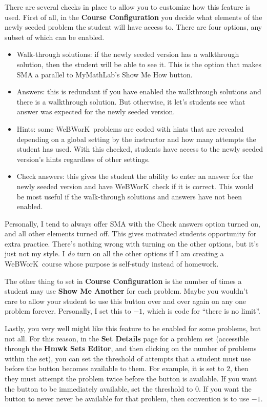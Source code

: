 \documentclass[12pt]{article}
\newcommand{\menu}[1]{\textbf{#1}}
\newcommand{\WW}{WeBWorK}
\newcommand{\HSE}{\menu{Hmwk Sets Editor}}
\begin{document}
There are several checks in place to allow you to customize how this feature is used. First of all, in the \menu{Course Configuration} you decide what elements of the newly seeded problem the student will have access to. There are four options, any subset of which can be enabled.
\begin{itemize}
\item Walk-through solutions: if the newly seeded version has a walkthrough solution, then the student will be able to see it. This is the option that makes SMA a parallel to MyMathLab's Show Me How button.
\item Answers: this is redundant if you have enabled the walkthrough solutions and there is a walkthrough solution. But otherwise, it let's students see what answer was expected for the newly seeded version.
\item Hints: some \WW\ problems are coded with hints that are revealed depending on a global setting by the instructor and how many attempts the student has used. With this checked, students have access to the newly seeded version's hints regardless of other settings.
\item Check answers: this gives the student the ability to enter an answer for the newly seeded version and have \WW\ check if it is correct. This would be most useful if the walk-through solutions and answers have not been enabled.
\end{itemize}

Personally, I tend to always offer SMA with the Check answers option turned on, and all other elements turned off. This gives motivated students opportunity for extra practice. There's nothing wrong with turning on the other options, but it's just not my style. I \emph{do} turn on all the other options if I am creating a \WW\ course whose purpose is self-study instead of homework.

The other thing to set in \menu{Course Configuration} is the number of times a student may use \menu{Show Me Another} for each problem. Maybe you wouldn't care to allow your student to use this button over and over again on any one problem forever. Personally, I set this to $-1$, which is code for ``there is no limit''.

Lastly, you very well might like this feature to be enabled for some problems, but not all. For this reason, in the \menu{Set Details} page for a problem set (accessible through the \HSE, and then clicking on the number of problems within the set), you can set the threshold of attempts that a student must use before the button becomes available to them. For example, it is set to $2$, then they must attempt the problem twice before the button is available. If you want the button to be immediately available, set the threshold to $0$.  If you want the button to never never be available for that problem, then convention is to use $-1$.
\end{document}
